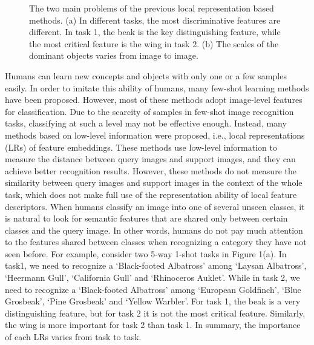 \documentclass[final]{cvpr}
\begin{document}
	\begin{figure}
		\centering          
		      \caption{The two main problems of the previous local representation based methods. (a) In different tasks, the most discriminative features are different. In task 1, the beak is the key distinguishing feature, while the most critical feature is the wing in task 2.
			(b) The scales of the dominant objects varies from image to image.}      \label{fig1}  
	\end{figure}
	Humans can learn new concepts and objects with only one or a few samples easily.
	In order to imitate this ability of humans, many few-shot learning methods \cite{vinyals2016matching,finn2017model,snell2017prototypical,sung2018learning,sun2019meta,li2019revisiting,li2019distribution} have been proposed. However, most of these methods \cite{vinyals2016matching,finn2017model,snell2017prototypical,sung2018learning,sun2019meta} adopt image-level features for classification.
	Due to the scarcity of samples in few-shot image recognition tasks, classifying at such a level may not be effective enough. Instead, many methods \cite{li2019revisiting,li2019distribution} based on low-level information were proposed, i.e., local representations (LRs) of feature embeddings. 
	These methods use low-level information to measure the distance between query images and support images, and they can achieve better recognition results.
	However, these methods do not measure the similarity between query images and support images in the context of the whole task, which does not make full use of the representation ability of local feature descriptors. When humans classify an image into one of several unseen classes, it is natural to look for semantic features that are shared only between certain classes and the query image. In other words, humans do not pay much attention to the features shared between classes when recognizing a category they have not seen before. 
	For example, consider two 5-way 1-shot tasks in Figure 1(a). In task1, we need to recognize a `Black-footed Albatross' among `Laysan Albatross', `Heermann Gull', `California Gull' and `Rhinoceros Auklet'. While in task 2, we need to recognize a `Black-footed Albatross' among `European Goldfinch', `Blue Grosbeak', `Pine Grosbeak' and `Yellow Warbler'. For task 1, the beak is a very distinguishing feature, but for task 2 it is not the most critical feature. Similarly, the wing is more important for task 2 than task 1. In summary, the importance of each LRs varies from task to task.
	
\end{document}
